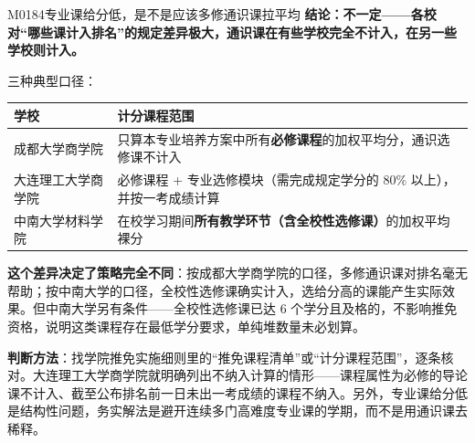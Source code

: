 \begin{qa}{M0184}{专业课给分低，是不是应该多修通识课拉平均}
\textbf{结论：不一定——各校对“哪些课计入排名”的规定差异极大，通识课在有些学校完全不计入，在另一些学校则计入。}

三种典型口径：

\par\vspace{2pt}\nobreak\begin{center}\footnotesize
\begin{tabularx}{\textwidth}{>{\raggedright\arraybackslash}X>{\raggedright\arraybackslash}X}
\toprule
\textbf{学校} & \textbf{计分课程范围} \\ \midrule
成都大学商学院 & 只算本专业培养方案中所有\textbf{必修课程}的加权平均分，通识选修课不计入 \\
大连理工大学商学院 & 必修课程 + 专业选修模块（需完成规定学分的 80\% 以上），并按一考成绩计算 \\
中南大学材料学院 & 在校学习期间\textbf{所有教学环节（含全校性选修课）}的加权平均裸分 \\
\bottomrule
\end{tabularx}
\end{center}\vspace{2pt}\par

\textbf{这个差异决定了策略完全不同}：按成都大学商学院的口径，多修通识课对排名毫无帮助；按中南大学的口径，全校性选修课确实计入，选给分高的课能产生实际效果。但中南大学另有条件——全校性选修课已达 6 个学分且及格的，不影响推免资格，说明这类课程存在最低学分要求，单纯堆数量未必划算。

\textbf{判断方法}：找学院推免实施细则里的“推免课程清单”或“计分课程范围”，逐条核对。大连理工大学商学院就明确列出不纳入计算的情形——课程属性为必修的导论课不计入、截至公布排名前一日未出一考成绩的课程不纳入。另外，专业课给分低是结构性问题，务实解法是避开连续多门高难度专业课的学期，而不是用通识课去稀释。
\end{qa}

